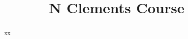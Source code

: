 \documentclass{xourse}
\title{N Clements Course}
\begin{document}
\begin{abstract} 
xx
\end{abstract}
\maketitle
{}
\end{document}
